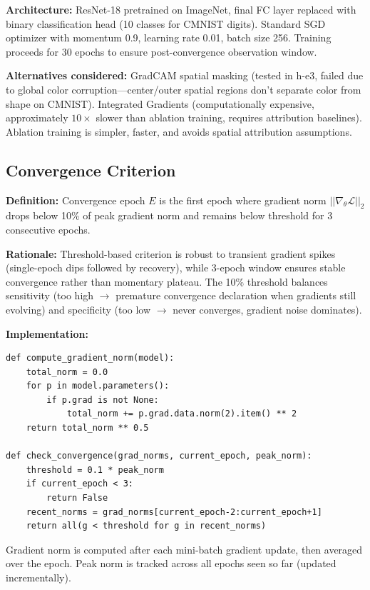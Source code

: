 \textbf{Architecture:} ResNet-18 pretrained on ImageNet, final FC layer replaced with binary classification head (10 classes for CMNIST digits). Standard SGD optimizer with momentum 0.9, learning rate 0.01, batch size 256. Training proceeds for 30 epochs to ensure post-convergence observation window.

\textbf{Alternatives considered:} GradCAM spatial masking (tested in h-e3, failed due to global color corruption---center/outer spatial regions don't separate color from shape on CMNIST). Integrated Gradients (computationally expensive, approximately $10\times$ slower than ablation training, requires attribution baselines). Ablation training is simpler, faster, and avoids spatial attribution assumptions.

\subsection{Convergence Criterion}

\textbf{Definition:} Convergence epoch $E$ is the first epoch where gradient norm $||\nabla_\theta \mathcal{L}||_2$ drops below 10\% of peak gradient norm and remains below threshold for 3 consecutive epochs.

\textbf{Rationale:} Threshold-based criterion is robust to transient gradient spikes (single-epoch dips followed by recovery), while 3-epoch window ensures stable convergence rather than momentary plateau. The 10\% threshold balances sensitivity (too high $\rightarrow$ premature convergence declaration when gradients still evolving) and specificity (too low $\rightarrow$ never converges, gradient noise dominates).

\textbf{Implementation:}
\begin{verbatim}
def compute_gradient_norm(model):
    total_norm = 0.0
    for p in model.parameters():
        if p.grad is not None:
            total_norm += p.grad.data.norm(2).item() ** 2
    return total_norm ** 0.5

def check_convergence(grad_norms, current_epoch, peak_norm):
    threshold = 0.1 * peak_norm
    if current_epoch < 3:
        return False
    recent_norms = grad_norms[current_epoch-2:current_epoch+1]
    return all(g < threshold for g in recent_norms)
\end{verbatim}

Gradient norm is computed after each mini-batch gradient update, then averaged over the epoch. Peak norm is tracked across all epochs seen so far (updated incrementally).

